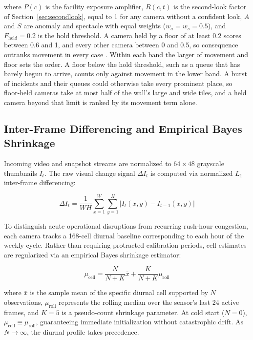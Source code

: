 \documentclass[10pt,journal,compsoc]{IEEEtran}
\begin{document}
\noindent where $P(c)$ is the facility exposure amplifier, $R(c,t)$ is the second-look factor of Section~\ref{sec:secondlook}, equal to 1 for any camera without a confident look, $A$ and $S$ are anomaly and spectacle with equal weights ($w_a = w_s = 0.5$), and $F_{\text{hold}} = 0.2$ is the hold threshold. A camera held by a floor of at least 0.2 scores between 0.6 and 1, and every other camera between 0 and 0.5, so consequence outranks movement in every case \cite{fishburn1974}. Within each band the larger of movement and floor sets the order. A floor below the hold threshold, such as a queue that has barely begun to arrive, counts only against movement in the lower band. A burst of incidents and their queues could otherwise take every prominent place, so floor-held cameras take at most half of the wall's large and wide tiles, and a held camera beyond that limit is ranked by its movement term alone.

\subsection{Inter-Frame Differencing and Empirical Bayes Shrinkage}
Incoming video and snapshot streams are normalized to $64 \times 48$ grayscale thumbnails $I_t$. The raw visual change signal $\Delta I_t$ is computed via normalized $L_1$ inter-frame differencing:

\begin{equation}
\Delta I_t = \frac{1}{WH} \sum_{x=1}^{W} \sum_{y=1}^{H} |I_t(x,y) - I_{t-1}(x,y)|
\label{eq:diff}
\end{equation}

To distinguish acute operational disruptions from recurring rush-hour congestion, each camera tracks a 168-cell diurnal baseline corresponding to each hour of the weekly cycle. Rather than requiring protracted calibration periods, cell estimates are regularized via an empirical Bayes shrinkage estimator:

\begin{equation}
\mu_{\text{cell}} = \frac{N}{N + K}\bar{x} + \frac{K}{N + K}\mu_{\text{roll}}
\label{eq:shrinkage}
\end{equation}

\noindent where $\bar{x}$ is the sample mean of the specific diurnal cell supported by $N$ observations, $\mu_{\text{roll}}$ represents the rolling median over the sensor's last 24 active frames, and $K = 5$ is a pseudo-count shrinkage parameter. At cold start ($N = 0$), $\mu_{\text{cell}} \equiv \mu_{\text{roll}}$, guaranteeing immediate initialization without catastrophic drift. As $N \to \infty$, the diurnal profile takes precedence.
\end{document}
